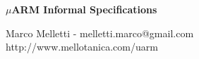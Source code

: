 \documentclass{report}
\begin{document}
\begin{titlepage}
\begin{center}
	\huge\textbf{$\mu$ARM Informal Specifications}
\end{center}
\vfill
\Large{Marco Melletti - melletti.marco@gmail.com\\http://www.mellotanica.com/uarm}
\end{titlepage}

\tableofcontents







%




\end{document}
